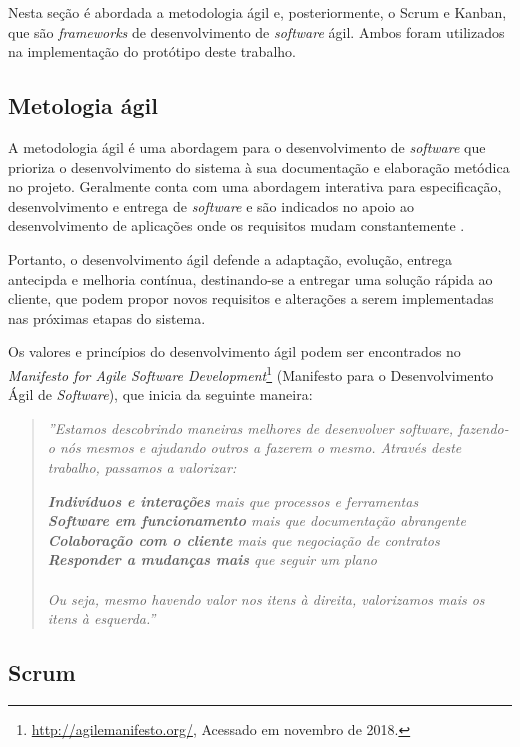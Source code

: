 Nesta seção é abordada a metodologia ágil e, posteriormente, o Scrum e Kanban, que são \textit{frameworks} de desenvolvimento de \textit{software} ágil. Ambos foram utilizados na implementação do protótipo deste trabalho.


\subsection{Metologia ágil}
\label{fundSWAgil}

A metodologia ágil é uma abordagem para o desenvolvimento de \textit{software} que prioriza o desenvolvimento do sistema à sua documentação e elaboração metódica no projeto. Geralmente conta com uma abordagem interativa para especificação, desenvolvimento e entrega de \textit{software} e são indicados no apoio ao desenvolvimento de aplicações onde os requisitos mudam constantemente \cite{sommerville}.

Portanto, o desenvolvimento ágil defende a adaptação, evolução, entrega antecipda e melhoria contínua, destinando-se a entregar uma solução rápida ao cliente, que podem propor novos requisitos e alterações a serem implementadas nas próximas etapas do sistema.

Os valores e princípios do desenvolvimento ágil podem ser encontrados no \textit{Manifesto for Agile Software Development}\footnote{\url{http://agilemanifesto.org/}, Acessado em novembro de 2018.} (Manifesto para o Desenvolvimento Ágil de \textit{Software}), que inicia da seguinte maneira:

\begin{quote}
    \textit{''Estamos descobrindo maneiras melhores de desenvolver software, fazendo-o nós mesmos e ajudando outros a 
    fazerem o mesmo. Através deste trabalho, passamos a valorizar:}
    
        \textit{\textbf{Indivíduos e interações} mais que processos e ferramentas \\
        \textbf{Software em funcionamento} mais que documentação abrangente \\
        \textbf{Colaboração com o cliente} mais que negociação de contratos \\
        \textbf{Responder a mudanças mais} que seguir um plano \\}
        \\
        \textit{Ou seja, mesmo havendo valor nos itens à direita, valorizamos mais os itens à esquerda.''}
\end{quote}


\subsection{Scrum}
\label{fundSWSCRUM}


